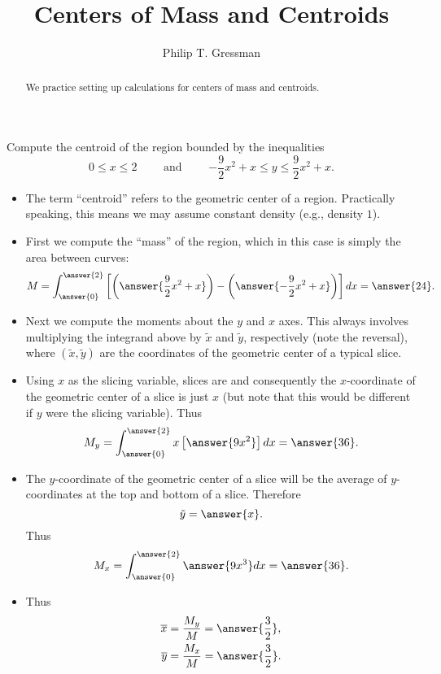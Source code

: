 \documentclass{ximera}
\title{Centers of Mass and Centroids}
\author{Philip T. Gressman}
\begin{document}
\begin{abstract}
We practice setting up calculations for centers of mass and centroids.
\end{abstract}
\maketitle

\begin{example}%
Compute the centroid of the region bounded by the inequalities $$0 \leq x \leq 2 \qquad \mbox{ and } \qquad {-\frac{9}{2}x^2+x} \leq y \leq {\frac{9}{2}x^2+x}.$$
\begin{itemize}
\item The term ``centroid'' refers to the geometric center of a region. Practically speaking, this means we may assume constant density (e.g., density $1$).
\item First we compute the ``mass'' of the region, which in this case is simply the area between curves:
\[ M = \int_{\answer{0}}^{\answer{2}} \left[ \left(\answer{\frac{9}{2}x^2+x}\right) - \left(\answer{-\frac{9}{2}x^2+x}\right) \right] dx  = \answer{24}. \]
\item Next we compute the moments about the $y$ and $x$ axes. This always involves multiplying the integrand above by $\tilde x$ and $\tilde y$, respectively (note the reversal), where $(\tilde x,\tilde y)$ are the coordinates of the geometric center of a typical slice.
\item Using $x$ as the slicing variable, slices are  and consequently the $x$-coordinate of the geometric center of a slice is just $x$ (but note that this would be different if $y$ were the slicing variable).  Thus
\[ M_y= \int_{\answer{0}}^{\answer{2}} x \left[ \answer{9 x^2} \right] dx = \answer{36}. \]
\item The $y$-coordinate of the geometric center of a slice will be the average of $y$-coordinates at the top and bottom of a slice. Therefore
\[ \tilde y = \answer{x}. \]
Thus
\[ M_x = \int_{\answer{0}}^{\answer{2}}  \answer{9x^3}  dx = \answer{36}. \]
\item Thus
\[ \begin{aligned}
 \overline{x} &  = \frac{M_y}{M} = \answer{\frac{3}{2}}, \\
 \overline{y} &  = \frac{M_x}{M} = \answer{\frac{3}{2}}.
 \end{aligned} \]
 \end{itemize}
\end{example}
\end{document}
